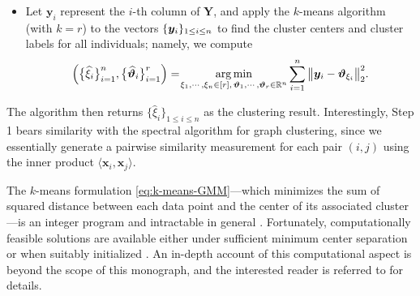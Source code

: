 \begin{itemize}
	\item[3.] Let $\bm{y}_i$ represent the $i$-th column of $\bm{Y}$, and apply the $k$-means algorithm
	(with $k=r$) to the vectors $\{{\boldsymbol y}_i\}_{1 \leq i \leq n}$  to find the cluster centers and cluster labels for all individuals; namely, we  compute
%
\begin{equation}
\Big(\big\{\widehat{\xi}_{i}\big\}_{i=1}^{n},\big\{\widehat{\bm{\vartheta}}_{i}\big\}_{i=1}^{r}\Big)
= \hspace{-0.2em}
\underset{\xi_{1},\cdots,\xi_{n}\in[r],\,\bm{\vartheta}_{1},\cdots,\bm{\vartheta}_{r}\in\mathbb{R}^{n}}{\arg\min}\sum_{i=1}^{n}\big\|\bm{y}_{i}-\bm{\vartheta}_{\xi_{i}}\big\|_{2}^{2} .
\label{eq:k-means-GMM}
\end{equation}
%
\end{itemize}
%
The algorithm then returns $\big\{\widehat{\xi}_{i}\big\}_{1\leq i\leq n}$ as the clustering result.
Interestingly, Step 1 bears similarity with the spectral algorithm for graph clustering,
since  we essentially generate a pairwise similarity measurement for each pair $(i,j)$ using the inner product $\langle \bm{x}_i, \bm{x}_j \rangle$.

\begin{remark}
	The $k$-means formulation \eqref{eq:k-means-GMM}---which minimizes the sum of squared distance between each data point and the center of its associated cluster---is
	an integer program and intractable in general \citep{aloise2009np}.
	Fortunately, computationally feasible solutions are available either under sufficient minimum center separation or when suitably initialized
	\citep{lloyd1982least,vempala2004spectral,lu2016statistical,peng2007approximating,awasthi2015relax,mixon2017clustering,iguchi2017probably}.
	An in-depth account of this computational aspect is beyond the scope of this monograph,
	and the interested reader is referred to \citet{li2020birds,loffler2019optimality} for details.
\end{remark}


